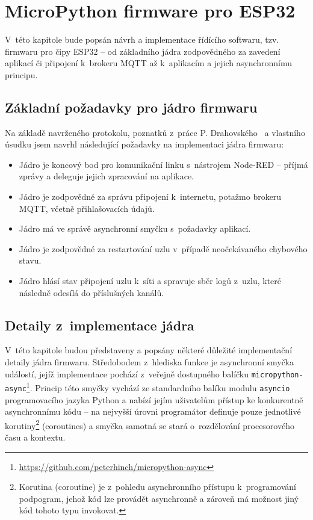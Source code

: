 \chapter{MicroPython firmware pro ESP32}
\label{ch:firmware}

V~této kapitole bude popsán návrh a implementace řídícího softwaru, tzv. firmwaru pro čipy ESP32 -- od základního
jádra zodpovědného za zavedení aplikací či připojení k~brokeru MQTT až k~aplikacím a jejich asynchronnímu principu.

\section{Základní požadavky pro jádro firmwaru}\label{sec:základní-požadavky-pro-jádro}
Na základě navrženého protokolu, poznatků z~práce P. Drahovského~\cite{DrahovskyPeter2017RIun} a vlastního úsudku jsem
navrhl následující požadavky na implementaci jádra firmwaru:

\begin{itemize}
    \item Jádro je koncový bod pro komunikační linku s~nástrojem Node-RED -- příjmá zprávy a deleguje jejich
    zpracování na aplikace.
    \item Jádro je zodpovědné za správu připojení k~internetu, potažmo brokeru MQTT, včetně přihlašovacích údajů.
    \item Jádro má ve správě asynchronní smyčku s~požadavky aplikací.
    \item Jádro je zodpovědné za restartování uzlu v~případě neočekávaného chybového stavu.
    \item Jádro hlásí stav připojení uzlu k~síti a spravuje sběr logů z~uzlu, které následně odesílá do příslušných
    kanálů.
\end{itemize}

\section{Detaily z~implementace jádra}\label{sec:detaily-z-implementace-jadra}
V~této kapitole budou představeny a popsány některé důležité implementační detaily jádra firmwaru.
Středobodem z~hlediska funkce je asynchronní smyčka událostí, jejíž implementace pochází z~veřejně dostupného balíčku
\texttt{micropython-async}\footnote{\url{https://github.com/peterhinch/micropython-async}}.
Princip této smyčky vychází ze standardního balíku modulu \texttt{asyncio} programovacího jazyka Python a
nabízí jejím uživatelům přístup ke konkurentně asynchronnímu kódu -- na nejvyšší úrovni programátor definuje pouze
jednotlivé korutiny\footnote{Korutina (coroutine) je z~pohledu asynchronního přístupu k~programování podpogram,
jehož kód lze provádět asynchronně a zároveň má možnost jiný kód tohoto typu invokovat.} (coroutines) a smyčka samotná
se stará o~rozdělování procesorového času a kontextu.

